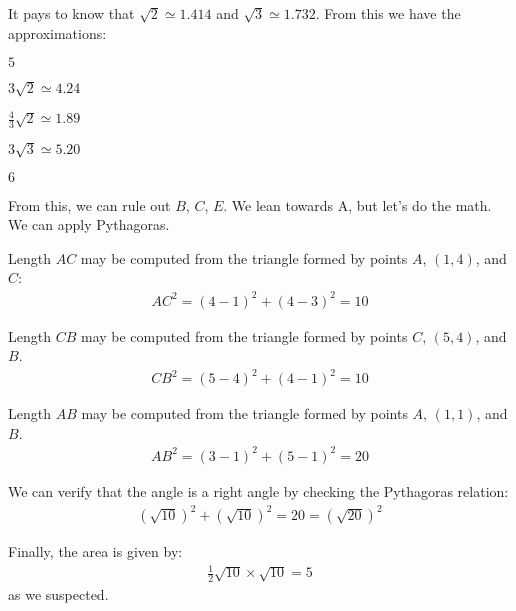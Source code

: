 \documentclass[12pt]{article}
\begin{document}
It pays to know that $\sqrt{2}\simeq1.414$ and $\sqrt{3}\simeq1.732$. From this we have the approximations: 
\begin{question}
\begin{enumerate*}
  \item $5$
  \item $3\sqrt{2}\simeq 4.24$
  \item $\frac{4}{3}\sqrt{2} \simeq 1.89$
  \item $3\sqrt{3} \simeq 5.20$
  \item $6$
\end{enumerate*}
\end{question}
From this, we can rule out $B$, $C$, $E$. We lean towards A, but let's do the math. We can apply Pythagoras. 

Length $AC$ may be computed from the triangle formed by points $A$, $(1,4)$, and $C$:
\begin{align*}
AC^2 = (4-1)^2 + (4-3)^2 = 10
\end{align*}

Length $CB$ may be computed from the triangle formed by points $C$, $(5,4)$, and $B$.
\begin{align*}
CB^2 = (5-4)^2 + (4-1)^2 = 10
\end{align*}

Length $AB$ may be computed from the triangle formed by points $A$, $(1,1)$, and $B$.
\begin{align*}
AB^2 = (3-1)^2 + (5-1)^2 = 20
\end{align*}

We can verify that the angle is a right angle by checking the Pythagoras relation:
\begin{align*}
(\sqrt{10})^2 + (\sqrt{10})^2  = 20 = (\sqrt{20})^2 
\end{align*}

Finally, the area is given by:
\begin{align*}
\frac{1}{2} \sqrt{10} \times \sqrt{10}  = 5
\end{align*}
as we suspected. 




\newpage
\end{document}

